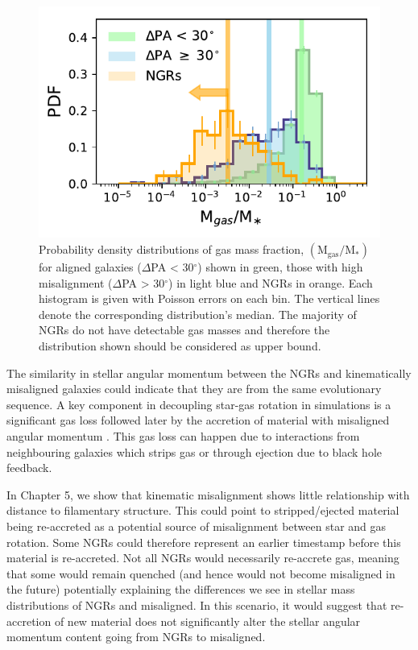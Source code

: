 \begin{figure}
    \centering
	\includegraphics[width=0.8\linewidth]{misalignment_MaNGA/gas_mass_normed_all.pdf}
    \caption{Probability density distributions of gas mass fraction, $\mathrm{(M_{gas}/M_{\ast})}$ for aligned galaxies ($\Delta$PA < 30$^{\circ}$) shown in green, those with high misalignment ($\Delta$PA > 30$^{\circ}$) in light blue and NGRs in orange. Each histogram is given with Poisson errors on each bin. The vertical lines denote the corresponding distribution's median. The majority of NGRs do not have detectable gas masses and therefore the distribution shown should be considered as upper bound.}
    \label{fig:delPA_gasM}
\end{figure}

The similarity in stellar angular momentum between the NGRs and kinematically misaligned galaxies could indicate that they are from the same evolutionary sequence. A key component in decoupling star-gas rotation in simulations is a significant gas loss followed later by the accretion of material with misaligned angular momentum \citep[][]{vdvoort2015, starkenburg+19}. This gas loss can happen due to interactions from neighbouring galaxies which strips gas or through ejection due to black hole feedback.

In Chapter 5, we show that kinematic misalignment shows little relationship with distance to filamentary structure. This could point to stripped/ejected material being re-accreted as a potential source of misalignment between star and gas rotation. Some NGRs could therefore represent an earlier timestamp before this material is re-accreted. Not all NGRs would necessarily re-accrete gas, meaning that some would remain quenched (and hence would not become misaligned in the future) potentially explaining the differences we see in stellar mass distributions of NGRs and misaligned. In this scenario, it would suggest that re-accretion of new material does not significantly alter the stellar angular momentum content going from NGRs to misaligned.

